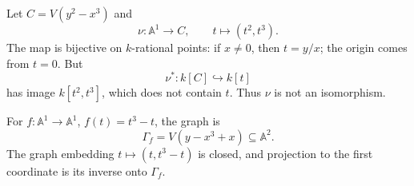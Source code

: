 \begin{example}
Let \(C=V(y^2-x^3)\) and
\[
\nu:\mathbb A^1\to C,\qquad t\mapsto(t^2,t^3).
\]
The map is bijective on \(k\)-rational points: if \(x\neq0\), then \(t=y/x\); the origin
comes from \(t=0\).  But
\[
\nu^*:k[C]\hookrightarrow k[t]
\]
has image \(k[t^2,t^3]\), which does not contain \(t\).  Thus \(\nu\) is not an
isomorphism.
\end{example}

\begin{example}
For \(f:\mathbb A^1\to\mathbb A^1\), \(f(t)=t^3-t\), the graph is
\[
\Gamma_f=V(y-x^3+x)\subseteq\mathbb A^2.
\]
The graph embedding \(t\mapsto(t,t^3-t)\) is closed, and projection to the first coordinate
is its inverse onto \(\Gamma_f\).
\end{example}
